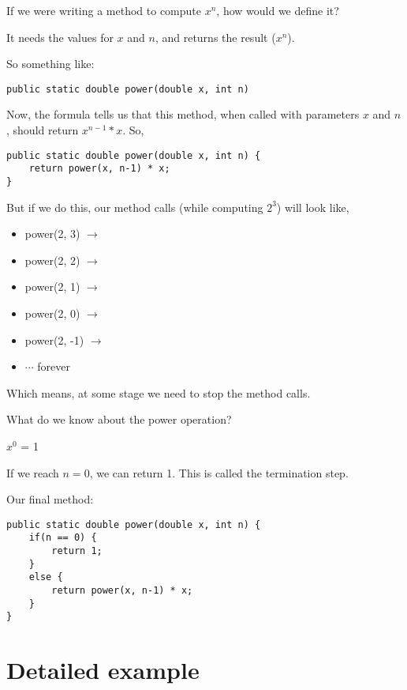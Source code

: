 If we were writing a method to compute $x^n$, how would we define it?

It needs the values for $x$ and $n$, and returns the result ($x^n$).

So something like:

\begin{lstlisting}
public static double power(double x, int n)
\end{lstlisting}

Now, the formula tells us that this method, when called with parameters $x$ and $n$, should return $x^{n-1} * x$. So,

\begin{lstlisting}
public static double power(double x, int n) {
	return power(x, n-1) * x;
}
\end{lstlisting}

But if we do this, our method calls (while computing $2^3$) will look like,

\begin{itemize}
\item power(2, 3) $\rightarrow$
\item power(2, 2) $\rightarrow$
\item power(2, 1) $\rightarrow$
\item power(2, 0) $\rightarrow$
\item power(2, -1) $\rightarrow$
\item $\cdots$ forever
\end{itemize}

\newpage

Which means, at some stage we need to stop the method calls.

What do we know about the power operation? 

\begin{center}
\huge{$x^0$ = 1}
\end{center}
\normalsize

If we reach $n=0$, we can return 1.
This is called the termination step.

Our final method:

\begin{lstlisting}
public static double power(double x, int n) {
	if(n == 0) {
		return 1;
	}
	else {
		return power(x, n-1) * x;
	}
}
\end{lstlisting}

\section{Detailed example}

